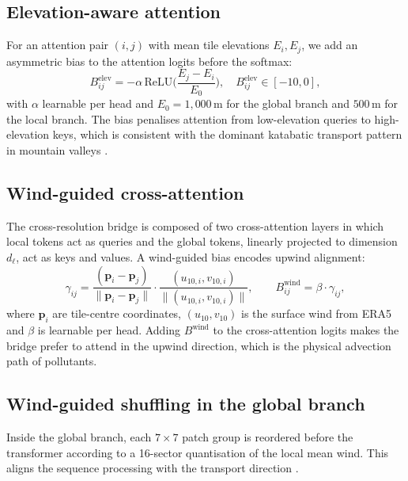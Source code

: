\subsection{Elevation-aware attention}
\label{sec:model:elev}

For an attention pair $(i, j)$ with mean tile elevations $E_i, E_j$,
we add an asymmetric bias to the attention logits before the
softmax:
\begin{equation}
B^{\text{elev}}_{ij} = -\alpha \,\text{ReLU}\!\Big(\frac{E_j - E_i}{E_0}\Big),
\quad B^{\text{elev}}_{ij} \in [-10, 0],
\end{equation}
with $\alpha$ learnable per head and $E_0 = 1{,}000$\,m for the
global branch and $500$\,m for the local branch. The bias penalises
attention from low-elevation queries to high-elevation keys, which
is consistent with the dominant katabatic transport pattern in
mountain valleys \citep{whiteman2000mountain}.

\subsection{Wind-guided cross-attention}
\label{sec:model:cross}

The cross-resolution bridge is composed of two cross-attention
layers in which local tokens act as queries and the global tokens,
linearly projected to dimension $d_\ell$, act as keys and values.
A wind-guided bias encodes upwind alignment:
\begin{equation}
\gamma_{ij} = \frac{(\mathbf{p}_i - \mathbf{p}_j)}{\|\mathbf{p}_i -
\mathbf{p}_j\|} \cdot \frac{(u_{10,i}, v_{10,i})}{\|(u_{10,i}, v_{10,i})\|},
\qquad
B^{\text{wind}}_{ij} = \beta \cdot \gamma_{ij},
\end{equation}
where $\mathbf{p}_i$ are tile-centre coordinates, $(u_{10}, v_{10})$
is the surface wind from ERA5 and $\beta$ is learnable per head.
Adding $B^{\text{wind}}$ to the cross-attention logits makes the
bridge prefer to attend in the upwind direction, which is the
physical advection path of pollutants.

\subsection{Wind-guided shuffling in the global branch}
\label{sec:model:wind}

Inside the global branch, each $7 \times 7$ patch group is
reordered before the transformer according to a 16-sector
quantisation of the local mean wind. This aligns the sequence
processing with the transport direction \citep{topoflow}.

